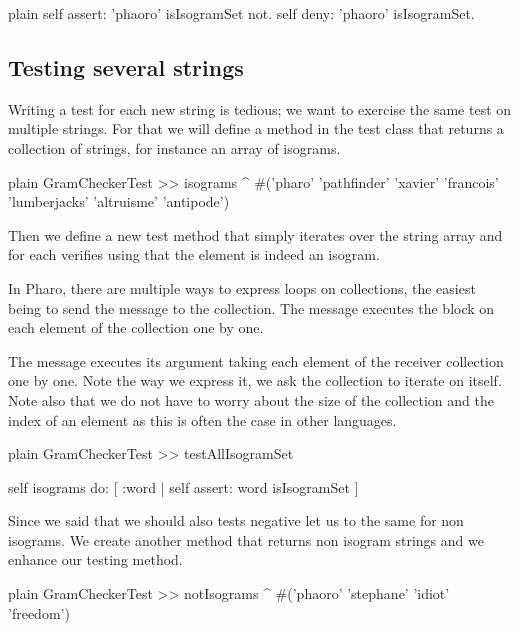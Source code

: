 \documentclass[10pt,twoside,english]{_support/latex/sbabook/sbabook}
\begin{document}
\begin{displaycode}{plain}
	self assert: 'phaoro' isIsogramSet not.
	self deny: 'phaoro' isIsogramSet.
\end{displaycode}
\subsection{Testing several strings}
Writing a test for each new string is tedious; we want to exercise the same test on multiple strings.
For that we will define a method in the test class that returns a collection of strings, for instance an array of isograms.

\begin{displaycode}{plain}
GramCheckerTest >> isograms
	^ #('pharo' 'pathfinder' 'xavier' 'francois' 'lumberjacks' 'altruisme' 'antipode')
\end{displaycode}

Then we define a new test method  that simply iterates over the string array and for each verifies using  that the element is indeed an isogram.

In Pharo, there are multiple ways to express loops on collections, the easiest being to send the message  to the collection. The  message executes the block on each element of the collection one by one.

\begin{coffee}
The  message executes its argument taking each element of the receiver collection one by one. Note the way we express it, we ask the collection to iterate on itself. Note also that we do not have to worry about the size of the collection and the index of an element as this is often the case in other languages.
\end{coffee}

\begin{displaycode}{plain}
GramCheckerTest >> testAllIsogramSet
	
	self isograms do: [ :word |
		self assert: word isIsogramSet ]
\end{displaycode}

Since we said that we should also tests negative let us to the same for non isograms. We create another method that returns non isogram strings and we enhance our testing method. 

\begin{displaycode}{plain}
GramCheckerTest >> notIsograms
	^ #('phaoro' 'stephane' 'idiot' 'freedom')
\end{displaycode}
\end{document}
